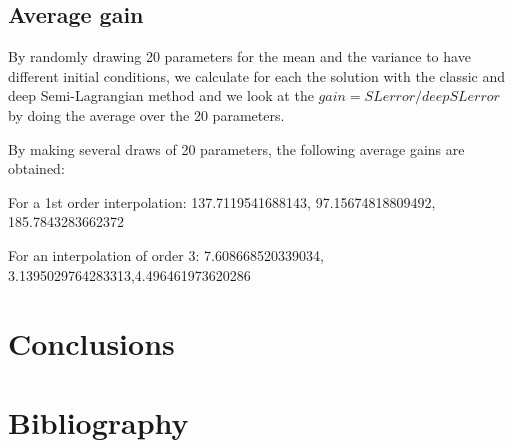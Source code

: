 \documentclass{article}
\begin{document}
\newpage

\subsection{Average gain}

By randomly drawing 20 parameters for the mean and the variance to have different initial conditions, we calculate for each the solution with the classic and deep Semi-Lagrangian method and we look at the $gain=SL error/deep SL error$ by doing the average over the 20 parameters.

By making several draws of 20 parameters, the following average gains are obtained:

For a 1st order interpolation: 137.7119541688143, 97.15674818809492, 185.7843283662372

For an interpolation of order 3: 7.608668520339034, 3.1395029764283313,4.496461973620286

\newpage
\section{Conclusions}

\section{Bibliography}

\end{document}
